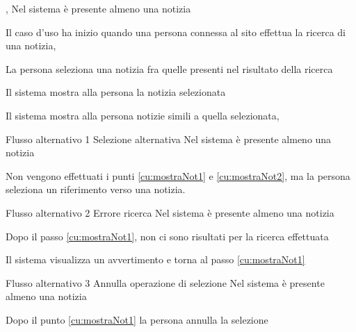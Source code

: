 
%


{, }
{Nel sistema è presente almeno una notizia}
{\postNulle}
{\begin{enumCU}
	\item Il caso d'uso ha inizio quando una persona connessa al sito effettua la ricerca di una notizia, \label{cu:mostraNot1}
	\item La persona seleziona una notizia fra quelle presenti nel risultato della ricerca\label{cu:mostraNot2}
	\item Il sistema mostra alla persona la notizia selezionata
	\item Il sistema mostra alla persona notizie simili a quella selezionata, 
\end{enumCU}}
%
{Flusso alternativo 1}%
{Selezione alternativa}%
{Nel sistema è presente almeno una notizia}%
{\postNulle}%
{\begin{enumCU}
		\item Non vengono effettuati i punti \ref{cu:mostraNot1} e \ref{cu:mostraNot2}, ma la persona seleziona un \gls{riferimento} verso una notizia.
\end{enumCU}}%
%
{Flusso alternativo 2}%
{Errore ricerca}%
{Nel sistema è presente almeno una notizia}%
{\postNulle}%
{\begin{enumCU}
		\item Dopo il passo \ref{cu:mostraNot1}, non ci sono risultati per la ricerca effettuata
		\item Il sistema visualizza un avvertimento e torna al passo \ref{cu:mostraNot1}
\end{enumCU}}%
%	
{Flusso alternativo 3}%
{Annulla operazione di selezione}%
{Nel sistema è presente almeno una notizia}%
{\postNulle}%
{\begin{enumCU}
		\item Dopo il punto \ref{cu:mostraNot1} la persona annulla la selezione
\end{enumCU}}%

